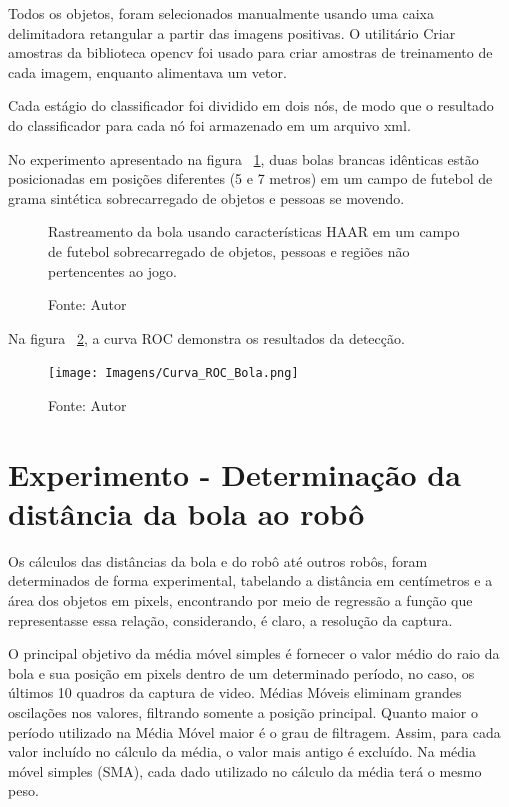 Todos os objetos, foram selecionados manualmente usando uma caixa delimitadora retangular a partir das imagens positivas. O utilitário Criar amostras da biblioteca opencv \cite{OpenCV} foi usado para criar amostras de treinamento de cada imagem, enquanto alimentava um vetor.

Cada estágio do classificador foi dividido em dois nós, de modo que o resultado do classificador para cada nó foi armazenado em um arquivo xml.

No experimento apresentado na figura ~\ref{fig:BolaHaar}, duas bolas brancas idênticas estão posicionadas em posições diferentes (5 e 7 metros) em um campo de futebol de grama sintética sobrecarregado de objetos e pessoas se movendo. 

\begin{figure}[!ht]
    \centering \caption{Rastreamento da bola usando características HAAR em um campo de futebol sobrecarregado de objetos, pessoas e regiões não pertencentes ao jogo.}
    \qquad
    \qquad
    \qquad

    \caption*{Fonte: Autor}
    \label{fig:BolaHaar}
\end{figure}

Na figura ~\ref{fig:RocBolaHaar}, a curva ROC demonstra os resultados da detecção.


\begin{figure}[!ht]
    \centering 
    \texttt{[image: Imagens/Curva\_ROC\_Bola.png]}
    \caption[Curva ROC para detecção da bola usando características HAAR.]{Fonte: Autor}
    \label{fig:RocBolaHaar}
\end{figure}

\section{Experimento - Determinação da distância da bola ao robô}
\label{exp:balldist}
Os cálculos das distâncias da bola e do robô até outros robôs, foram determinados de forma experimental, tabelando a distância em centímetros e a área dos objetos em pixels, encontrando por meio de regressão a função que representasse essa relação, considerando, é claro, a resolução da captura. 

O principal objetivo da média móvel simples é fornecer o valor médio do raio da bola e sua posição em pixels dentro de um determinado período, no caso, os últimos 10 quadros da captura de video. Médias Móveis eliminam grandes oscilações nos valores, filtrando somente a posição principal. Quanto maior o período utilizado na Média Móvel maior é o grau de filtragem. Assim, para cada valor incluído no cálculo da média, o valor mais antigo é excluído. Na média móvel simples (SMA), cada dado utilizado no cálculo da média terá o mesmo peso. 

